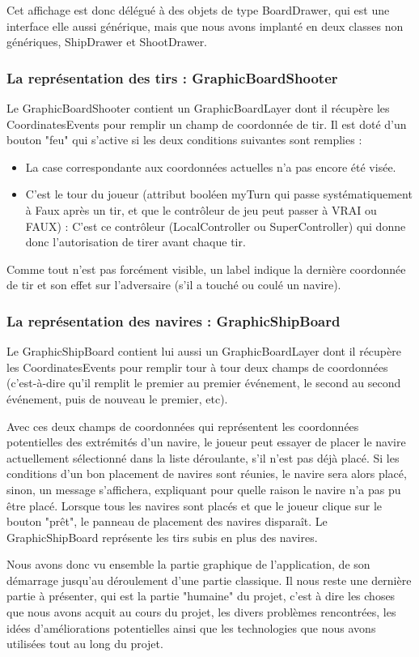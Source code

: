 	Cet affichage est donc délégué à des objets de type BoardDrawer, qui est une interface elle aussi générique, mais que nous avons implanté en deux classes non génériques, ShipDrawer et ShootDrawer.

\subsubsection{La représentation des tirs : GraphicBoardShooter}

	Le GraphicBoardShooter contient un GraphicBoardLayer dont il récupère les CoordinatesEvents pour remplir un champ de coordonnée de tir.
Il est doté d'un bouton "feu" qui s'active si les deux conditions suivantes sont remplies :
\begin{itemize}
\item La case correspondante aux coordonnées actuelles n'a pas encore été visée.
\item C'est le tour du joueur (attribut booléen myTurn qui passe systématiquement à Faux après un tir, et que le contrôleur de jeu peut passer à VRAI ou FAUX) : C'est ce contrôleur (LocalController ou SuperController) qui donne donc l'autorisation de tirer avant chaque tir.
\end{itemize}


Comme tout n'est pas forcément visible, un label indique la dernière coordonnée de tir et son effet sur l'adversaire (s'il a touché ou coulé un navire).

\subsubsection{La représentation des navires : GraphicShipBoard}

	Le GraphicShipBoard contient lui aussi un GraphicBoardLayer dont il récupère les CoordinatesEvents pour remplir tour à tour deux champs de coordonnées (c'est-à-dire qu'il remplit le premier au premier événement, le second au second événement, puis de nouveau le premier, etc). \newline
	
	Avec ces deux champs de coordonnées qui représentent les coordonnées potentielles des extrémités d'un navire, le joueur peut essayer de placer le navire actuellement sélectionné dans la liste déroulante, s'il n'est pas déjà placé.
Si les conditions d'un bon placement de navires sont réunies, le navire sera alors placé, sinon, un message s'affichera, expliquant pour quelle raison le navire n'a pas pu être placé.
\newline
	Lorsque tous les navires sont placés et que le joueur clique sur le bouton "prêt", le panneau de placement des navires disparaît.
	Le GraphicShipBoard représente les tirs subis en plus des navires. \newline
	
	Nous avons donc vu ensemble la partie graphique de l'application, de son démarrage jusqu'au déroulement d'une partie classique. Il nous reste une dernière partie à présenter, qui est la partie "humaine" du projet, c'est à dire les choses que nous avons acquit au cours du projet, les divers problèmes rencontrées, les idées d'améliorations potentielles ainsi que les technologies que nous avons utilisées tout au long du projet.